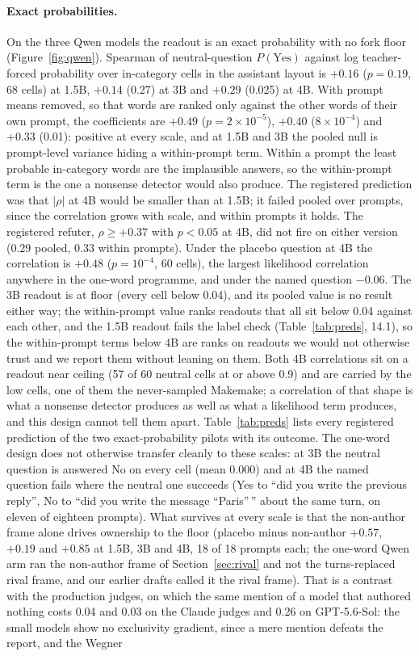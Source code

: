 \documentclass[twocolumn,10pt]{article}
\newcommand{\pyes}{P(\mathrm{Yes})}
\newcommand{\gpt}{GPT-5.6-Sol}
\begin{document}
\paragraph{Exact probabilities.} On the three Qwen models the readout is an exact probability with no fork floor (Figure~\ref{fig:qwen}). Spearman of neutral-question $\pyes$ against log teacher-forced probability over in-category cells in the assistant layout is $+0.16$ ($p=0.19$, 68 cells) at 1.5B, $+0.14$ (0.27) at 3B and $+0.29$ (0.025) at 4B. With prompt means removed, so that words are ranked only against the other words of their own prompt, the coefficients are $+0.49$ ($p=2\times10^{-5}$), $+0.40$ ($8\times10^{-4}$) and $+0.33$ (0.01): positive at every scale, and at 1.5B and 3B the pooled null is prompt-level variance hiding a within-prompt term. Within a prompt the least probable in-category words are the implausible answers, so the within-prompt term is the one a nonsense detector would also produce. The registered prediction was that $|\rho|$ at 4B would be smaller than at 1.5B; it failed pooled over prompts, since the correlation grows with scale, and within prompts it holds. The registered refuter, $\rho \geq +0.37$ with $p<0.05$ at 4B, did not fire on either version (0.29 pooled, 0.33 within prompts). Under the placebo question at 4B the correlation is $+0.48$ ($p=10^{-4}$, 60 cells), the largest likelihood correlation anywhere in the one-word programme, and under the named question $-0.06$. The 3B readout is at floor (every cell below 0.04), and its pooled value is no result either way; the within-prompt value ranks readouts that all sit below 0.04 against each other, and the 1.5B readout fails the label check (Table~\ref{tab:preds}, 14.1), so the within-prompt terms below 4B are ranks on readouts we would not otherwise trust and we report them without leaning on them. Both 4B correlations sit on a readout near ceiling (57 of 60 neutral cells at or above 0.9) and are carried by the low cells, one of them the never-sampled Makemake; a correlation of that shape is what a nonsense detector produces as well as what a likelihood term produces, and this design cannot tell them apart. Table~\ref{tab:preds} lists every registered prediction of the two exact-probability pilots with its outcome. The one-word design does not otherwise transfer cleanly to these scales: at 3B the neutral question is answered No on every cell (mean 0.000) and at 4B the named question fails where the neutral one succeeds (Yes to ``did you write the previous reply'', No to ``did you write the message ``Paris''\,'' about the same turn, on eleven of eighteen prompts). What survives at every scale is that the non-author frame alone drives ownership to the floor (placebo minus non-author $+0.57$, $+0.19$ and $+0.85$ at 1.5B, 3B and 4B, 18 of 18 prompts each; the one-word Qwen arm ran the non-author frame of Section~\ref{sec:rival} and not the turns-replaced rival frame, and our earlier drafts called it the rival frame). That is a contrast with the production judges, on which the same mention of a model that authored nothing costs 0.04 and 0.03 on the Claude judges and 0.26 on \gpt{}: the small models show no exclusivity gradient, since a mere mention defeats the report, and the Wegner 
\end{document}
